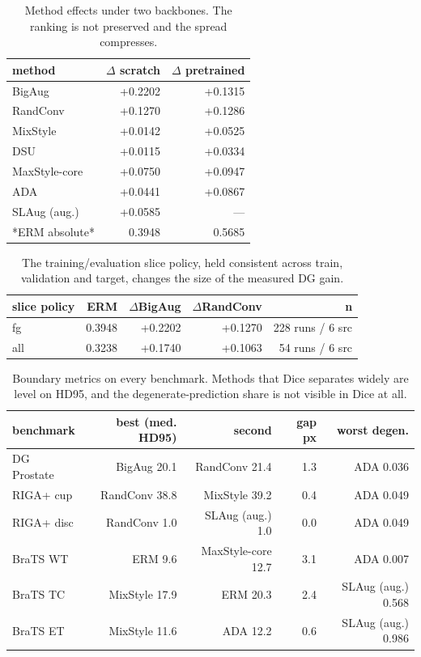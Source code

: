 \begin{table}[t]
\centering
\caption{Method effects under two backbones. The ranking is not preserved and the spread compresses.}
\label{tab:backbone}
\scriptsize
\setlength{\tabcolsep}{2pt}
\renewcommand{\arraystretch}{1.05}
\begin{tabular}{lrr}
\hline
method & $\Delta$ scratch & $\Delta$ pretrained \\
\hline
BigAug & +0.2202 & +0.1315 \\
RandConv & +0.1270 & +0.1286 \\
MixStyle & +0.0142 & +0.0525 \\
DSU & +0.0115 & +0.0334 \\
MaxStyle-core & +0.0750 & +0.0947 \\
ADA & +0.0441 & +0.0867 \\
SLAug (aug.) & +0.0585 & — \\
*ERM absolute* & 0.3948 & 0.5685 \\
\hline
\end{tabular}
\end{table}

\begin{table}[t]
\centering
\caption{The training/evaluation slice policy, held consistent across train, validation and target, changes the size of the measured DG gain.}
\label{tab:slice}
\scriptsize
\setlength{\tabcolsep}{2pt}
\renewcommand{\arraystretch}{1.05}
\begin{tabular}{lrrrr}
\hline
slice policy & ERM & $\Delta$BigAug & $\Delta$RandConv & n \\
\hline
fg & 0.3948 & +0.2202 & +0.1270 & 228 runs / 6 src \\
all & 0.3238 & +0.1740 & +0.1063 & 54 runs / 6 src \\
\hline
\end{tabular}
\end{table}

\begin{table}[t]
\centering
\caption{Boundary metrics on every benchmark. Methods that Dice separates widely are level on HD95, and the degenerate-prediction share is not visible in Dice at all.}
\label{tab:boundary}
\scriptsize
\setlength{\tabcolsep}{2pt}
\renewcommand{\arraystretch}{1.05}
\begin{tabular}{lrrrr}
\hline
benchmark & best (med. HD95) & second & gap px & worst degen. \\
\hline
DG Prostate & BigAug 20.1 & RandConv 21.4 & 1.3 & ADA 0.036 \\
RIGA+ cup & RandConv 38.8 & MixStyle 39.2 & 0.4 & ADA 0.049 \\
RIGA+ disc & RandConv 1.0 & SLAug (aug.) 1.0 & 0.0 & ADA 0.049 \\
BraTS WT & ERM 9.6 & MaxStyle-core 12.7 & 3.1 & ADA 0.007 \\
BraTS TC & MixStyle 17.9 & ERM 20.3 & 2.4 & SLAug (aug.) 0.568 \\
BraTS ET & MixStyle 11.6 & ADA 12.2 & 0.6 & SLAug (aug.) 0.986 \\
\hline
\end{tabular}
\end{table}


